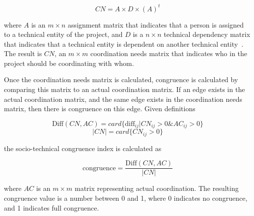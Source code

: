 \[ CN = A \times D \times (A)^t \]

\noindent where $A$ is an $m \times n$ assignment matrix that indicates that a person is assigned to a technical entity of the project, and $D$ is a $n \times n$ technical dependency matrix that indicates that a technical entity is dependent on another technical entity~\cite{cataldo2006:coordination_reqs}. The result is $CN$, an $m \times m$ coordination needs matrix that indicates who in the project should be coordinating with whom.


Once the coordination needs matrix is calculated, congruence is calculated by comparing this matrix to an actual coordination matrix. If an edge exists in the actual coordination matrix, and the same edge exists in the coordination needs matrix, then there is congruence on this edge. Given definitions


\[ \text{Diff}(CN, AC) = card\{ \text{diff}_{ij} | CN_{ij} > 0 \& AC_{ij} > 0 \} \]
\[|CN| = card \{ CN_{ij} > 0 \} \]

\noindent the socio-technical congruence index is calculated as~\cite{cataldo2008:stc}

\[ \text{congruence} = \frac{\text{Diff}(CN, AC)}  {|CN|} \]

\noindent where $AC$ is an $m \times m$ matrix representing actual coordination. The resulting congruence value is a number between 0 and 1, where 0 indicates no congruence, and 1 indicates full congruence.


